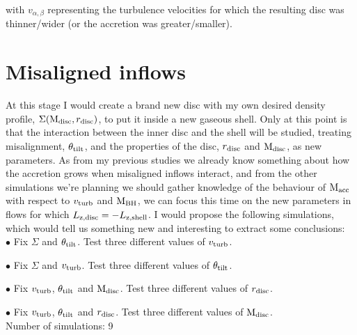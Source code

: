 \documentclass[11pt]{article} %
\def\mbh{{\rm M_{\rm BH}}}
\def\macc{{\rm M_{\rm acc}}}
\def\mdisc{{\rm M_{\rm disc}}}
\def\vturb{ v_{\rm turb} }
\def\rdisc{r_{\rm disc}}
\def\tilt{\theta_{\rm tilt}}
\begin{document}
\noindent with $v_{\alpha,\beta}$ representing the turbulence velocities for which the resulting disc was thinner/wider (or the accretion was greater/smaller).\\

\section{Misaligned inflows}

At this stage I would create a brand new disc with my own desired density profile, $\Sigma(\mdisc,\rdisc)$, to put it inside a new gaseous shell. Only at this point is that the interaction between the inner disc and the shell will be studied, treating misalignment, $\tilt$, and the properties of the disc, $\rdisc$ and $\mdisc$, as new parameters. As from my previous studies we already know something about how the accretion  grows when misaligned inflows interact, and from the other simulations we're planning we should gather knowledge of the behaviour of $\macc$ with respect to $\vturb$ and $\mbh$, we can focus this time on the new parameters in flows for which $L_{\rm z, disc} = - L_{\rm z, shell}$. I would propose the following simulations, which would tell us something new and interesting to extract some conclusions:\\

$\bullet$ Fix $\Sigma$ and $\tilt$. Test three different values of $\vturb$.

$\bullet$ Fix $\Sigma$ and $\vturb$. Test three different values of $\tilt$.

$\bullet$ Fix $\vturb$, $\tilt$ and $\mdisc$. Test three different values of $\rdisc$.

$\bullet$ Fix $\vturb$, $\tilt$ and $\rdisc$. Test three different values of $\mdisc$.\\

\noindent Number of simulations: 9\\

\end{document}
